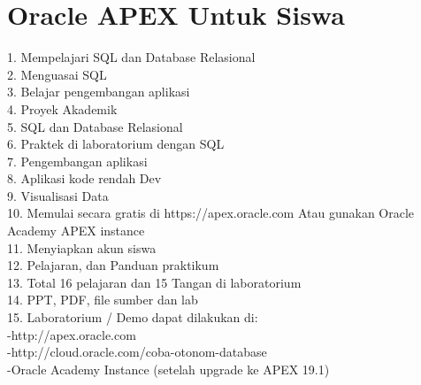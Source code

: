 \documentclass[12pt, times new roman, a4paper]{article}
\begin{document}
\section{Oracle APEX Untuk Siswa}
1. Mempelajari SQL dan Database Relasional \\
2. Menguasai SQL \\
3. Belajar pengembangan aplikasi \\
4. Proyek Akademik\\
5. SQL dan Database Relasional \\
6. Praktek di laboratorium dengan SQL \\
7. Pengembangan aplikasi \\
8. Aplikasi kode rendah Dev \\
9. Visualisasi Data \\
10. Memulai secara gratis di https://apex.oracle.com Atau gunakan Oracle Academy APEX instance \\
11. Menyiapkan akun siswa \\
12. Pelajaran, dan Panduan praktikum \\
13. Total 16 pelajaran dan 15 Tangan di laboratorium \\
14. PPT, PDF, file sumber dan lab \\
15. Laboratorium / Demo dapat dilakukan di: \\
-http://apex.oracle.com \\
-http://cloud.oracle.com/coba-otonom-database \\
-Oracle Academy Instance (setelah upgrade ke APEX 19.1) \\
\end{document}

